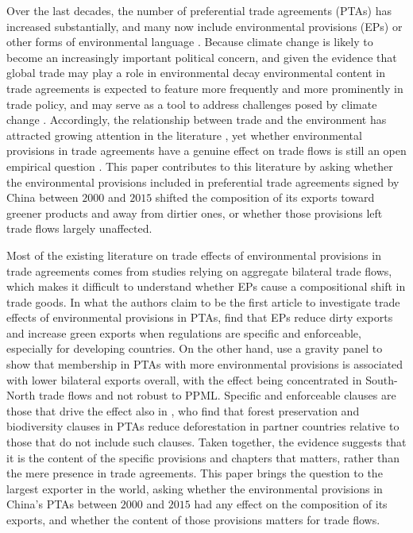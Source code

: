 \documentclass[12pt]{article}
\begin{document}
Over the last decades, the number of preferential trade agreements (PTAs) has increased substantially, and many now include environmental provisions (EPs) or other forms of environmental language \citep{morin2018, mattooHandbookDeepTrade2020}. Because climate change is likely to become an increasingly important political concern, and given the evidence that global trade may play a role in environmental decay \citep{zhangTransboundaryHealthImpacts2017} environmental content in trade agreements is expected to feature more frequently and more prominently in trade policy, and may serve as a tool to address challenges posed by climate change \citep{frankel2009}. Accordingly, the relationship between trade and the environment has attracted growing attention in the literature \citep{copeland2022}, yet whether environmental provisions in trade agreements have a genuine effect on trade flows is still an open empirical question \citep{gutsch2024, felbermayr2025}. This paper contributes to this literature by asking whether the environmental provisions included in preferential trade agreements signed by China between $2000$ and $2015$ shifted the composition of its exports toward greener products and away from dirtier ones, or whether those provisions left trade flows largely unaffected.

Most of the existing literature on trade effects of environmental provisions in trade agreements comes from studies relying on aggregate bilateral trade flows, which makes it difficult to understand whether EPs cause a compositional shift in trade goods. In what the authors claim to be the first article to investigate trade effects of environmental provisions in PTAs, \citet{brandi2020} find that EPs reduce dirty exports and increase green exports when regulations are specific and enforceable, especially for developing countries. On the other hand, \citet{berger2020} use a gravity panel to show that membership in PTAs with more environmental provisions is associated with lower bilateral exports overall, with the effect being concentrated in South-North trade flows and not robust to PPML. Specific and enforceable clauses are those that drive the effect also in \citet{abman2024}, who find that forest preservation and biodiversity clauses in PTAs reduce deforestation in partner countries relative to those that do not include such clauses. Taken together, the evidence suggests that it is the content of the specific provisions and chapters that matters, rather than the mere presence in trade agreements. This paper brings the question to the largest exporter in the world, asking whether the environmental provisions in China's PTAs between $2000$ and $2015$ had any effect on the composition of its exports, and whether the content of those provisions matters for trade flows.
\end{document}
